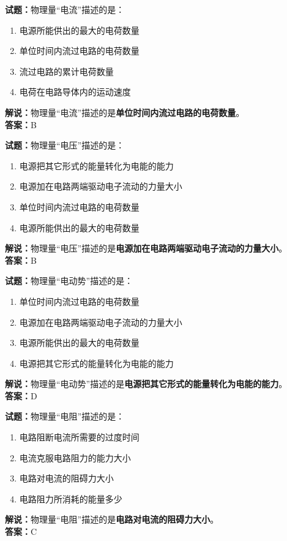 \documentclass{ctexbook}
\begin{document}
\bigskip


\noindent\textbf{试题：}物理量“电流”描述的是：
\begin{enumerate}[leftmargin=3em]
\item 电源所能供出的最大的电荷数量
\item 单位时间内流过电路的电荷数量
\item 流过电路的累计电荷数量
\item 电荷在电路导体内的运动速度
\end{enumerate}
\noindent\textbf{解说：}物理量“电流”描述的是\textbf{单位时间内流过电路的电荷数量}。\\\noindent\textbf{答案：}B



\bigskip


\noindent\textbf{试题：}物理量“电压”描述的是：
\begin{enumerate}[leftmargin=3em]
\item 电源把其它形式的能量转化为电能的能力
\item 电源加在电路两端驱动电子流动的力量大小
\item 单位时间内流过电路的电荷数量
\item 电源所能供出的最大的电荷数量
\end{enumerate}
\noindent\textbf{解说：}物理量“电压”描述的是\textbf{电源加在电路两端驱动电子流动的力量大小}。\\\noindent\textbf{答案：}B


\bigskip


\noindent\textbf{试题：}物理量“电动势”描述的是：
\begin{enumerate}[leftmargin=3em]
\item 单位时间内流过电路的电荷数量
\item 电源加在电路两端驱动电子流动的力量大小
\item 电源所能供出的最大的电荷数量
\item 电源把其它形式的能量转化为电能的能力
\end{enumerate}
\noindent\textbf{解说：}物理量“电动势”描述的是\textbf{电源把其它形式的能量转化为电能的能力}。\\\noindent\textbf{答案：}D



\bigskip


\noindent\textbf{试题：}物理量“电阻”描述的是：
\begin{enumerate}[leftmargin=3em]
\item 电路阻断电流所需要的过度时间
\item 电流克服电路阻力的能力大小
\item 电路对电流的阻碍力大小
\item 电路阻力所消耗的能量多少
\end{enumerate}
\noindent\textbf{解说：}物理量“电阻”描述的是\textbf{电路对电流的阻碍力大小}。\\\noindent\textbf{答案：}C
\end{document}
